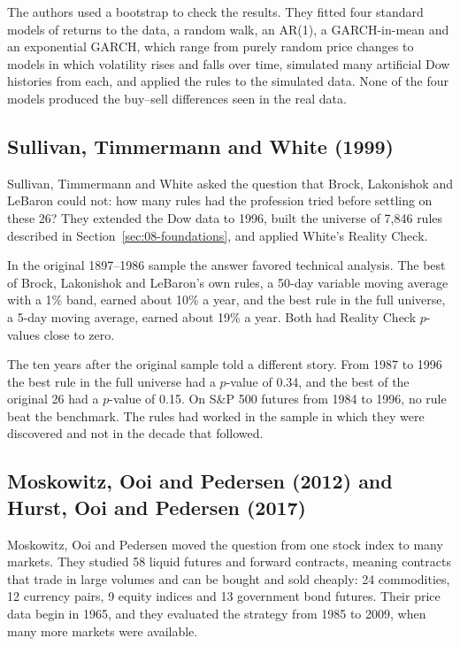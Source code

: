 The authors used a bootstrap to check the results. They fitted four standard models of returns to the data, a random walk, an AR(1), a GARCH-in-mean and an exponential GARCH, which range from purely random price changes to models in which volatility rises and falls over time, simulated many artificial Dow histories from each, and applied the rules to the simulated data. None of the four models produced the buy--sell differences seen in the real data.

\subsection{Sullivan, Timmermann and White (1999)}

Sullivan, Timmermann and White asked the question that Brock, Lakonishok and LeBaron could not: how many rules had the profession tried before settling on these 26? They extended the Dow data to 1996, built the universe of 7,846 rules described in Section~\ref{sec:08-foundations}, and applied White's Reality Check.

In the original 1897--1986 sample the answer favored technical analysis. The best of Brock, Lakonishok and LeBaron's own rules, a 50-day variable moving average with a 1\% band, earned about 10\% a year, and the best rule in the full universe, a 5-day moving average, earned about 19\% a year. Both had Reality Check $p$-values close to zero.

The ten years after the original sample told a different story. From 1987 to 1996 the best rule in the full universe had a $p$-value of 0.34, and the best of the original 26 had a $p$-value of 0.15. On S\&P 500 futures from 1984 to 1996, no rule beat the benchmark. The rules had worked in the sample in which they were discovered and not in the decade that followed.

\subsection{Moskowitz, Ooi and Pedersen (2012) and Hurst, Ooi and Pedersen (2017)}

Moskowitz, Ooi and Pedersen moved the question from one stock index to many markets. They studied 58 liquid futures and forward contracts, meaning contracts that trade in large volumes and can be bought and sold cheaply: 24 commodities, 12 currency pairs, 9 equity indices and 13 government bond futures. Their price data begin in 1965, and they evaluated the strategy from 1985 to 2009, when many more markets were available.

